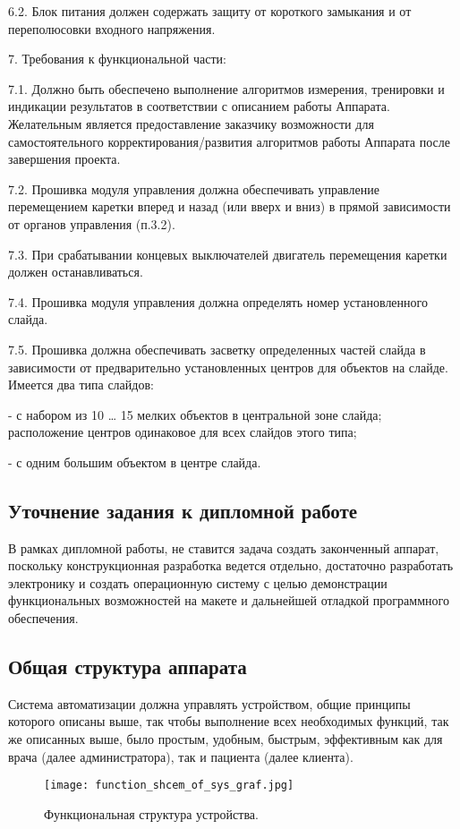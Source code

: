 6.2. Блок питания должен содержать защиту от короткого замыкания и от переполюсовки входного напряжения.

7. Требования к функциональной части:

7.1. Должно быть обеспечено выполнение алгоритмов измерения, тренировки и индикации результатов в соответствии с описанием работы Аппарата. Желательным является предоставление заказчику возможности для самостоятельного корректирования/развития алгоритмов работы Аппарата после завершения проекта.

7.2. Прошивка модуля управления должна обеспечивать управление перемещением каретки вперед и назад (или вверх и вниз) в прямой зависимости от органов управления (п.3.2).

7.3. При срабатывании концевых выключателей двигатель перемещения каретки должен останавливаться.

7.4. Прошивка модуля управления должна определять номер установленного слайда.

7.5. Прошивка должна обеспечивать засветку определенных частей слайда в зависимости от предварительно установленных центров для объектов на слайде. Имеется два типа слайдов:

- с набором из 10 … 15 мелких объектов в центральной зоне слайда; расположение центров одинаковое для всех слайдов этого типа;

- с одним большим объектом в центре слайда.
\subsection{Уточнение задания к дипломной работе}
В рамках дипломной работы, не ставится задача создать законченный аппарат, поскольку конструкционная разработка ведется отдельно, достаточно разработать электронику и создать операционную систему с целью демонстрации функциональных возможностей на макете и дальнейшей отладкой программного обеспечения. 
\subsection{Общая структура аппарата}
Система автоматизации должна управлять устройством, общие принципы которого описаны выше, так чтобы выполнение всех необходимых функций, так же описанных выше, было простым, удобным, быстрым, эффективным как для врача (далее администратора), так и пациента (далее клиента).

\begin{figure}[ht]
	\centering
     \texttt{[image: function\_shcem\_of\_sys\_graf.jpg]}
	\caption{Функциональная структура устройства.}
	\label{fig:graf:FunShcSys}
\end{figure}

